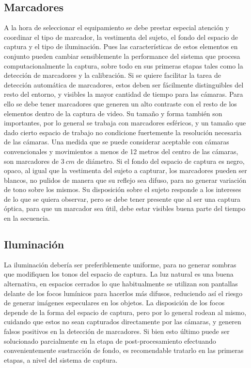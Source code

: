 \subsection{Marcadores}
A la hora de seleccionar el equipamiento se debe prestar especial atención y coordinar el tipo de marcador, la vestimenta del sujeto, el fondo del espacio de captura y el tipo de iluminación. Pues las características de estos elementos en conjunto pueden cambiar sensiblemente la performance del sistema que procesa computacionalmente la captura, sobre todo en sus primeras etapas tales como la detección de marcadores y la  calibración.
Si se quiere facilitar la tarea de detección automática de marcadores, estos deben ser fácilmente distinguibles del resto del entorno, y visibles la mayor cantidad de tiempo para las cámaras. Para ello se debe tener marcadores que generen un alto contraste con el resto de los elementos dentro de la captura de video. 
Su tamaño y forma también son importantes, por lo general se trabaja con marcadores esféricos, y un tamaño que dado cierto espacio de trabajo no condicione fuertemente la resolución necesaria de las cámaras. Una medida que se puede considerar aceptable con cámaras convencionales y movimientos a menos de 12 metros del centro de las cámaras, son marcadores de $3~cm$ de diámetro.  
Si el fondo del espacio de captura es negro, opaco, al igual que la vestimenta del sujeto a capturar, los marcadores pueden ser blancos, no pulidos de manera que su reflejo sea difuso, para no generar variación de tono sobre los mismos. 
Su disposición sobre el sujeto responde a los intereses de lo que se quiera observar, pero se debe tener presente que al ser una captura óptica, para que un marcador sea útil, debe estar visibles buena parte del tiempo en la secuencia.

\subsection{Iluminación}
La iluminación debería ser preferiblemente uniforme, para no generar sombras que modifiquen los tonos del espacio de captura. La luz natural es una buena alternativa, en espacios cerrados lo que habitualmente se utilizan son pantallas delante de los focos lumínicos para hacerlos más difusos, reduciendo así el riesgo de generar imágenes especulares en los objetos. La disposición de los focos depende de la forma del espacio de captura, pero por lo general rodean al mismo, cuidando que estos no sean capturados directamente por las cámaras, y generen falsos positivos en la detección de marcadores. Si bien esto último puede ser solucionado parcialmente en la etapa de  post-procesamiento efectuando convenientemente sustracción de fondo, es recomendable tratarlo en las primeras etapas, a nivel del sistema de captura. 

